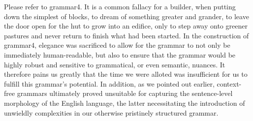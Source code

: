 \documentclass[11pt]{article}
\begin{document}
Please refer to grammar4. It is a common fallacy for a builder, when putting down the simplest of blocks, to dream of something greater and grander, to leave the door open for the hut to grow into an edifice, only to step away onto greener pastures and never return to finish what had been started. In the construction of grammar4, elegance was sacrificed to allow for the grammar to not only be immediately human-readable, but also to ensure that the grammar would be highly robust and sensitive to grammatical, or even semantic, nuances. It therefore pains us greatly that the time we were alloted was insufficient for us to fulfill this grammar's potential. In addition, as we pointed out earlier, context-free grammars ultimately proved unsuitable for capturing the sentence-level morphology of the English language, the latter necessitating the introduction of unwieldly complexities in our otherwise pristinely structured grammar.
\end{document}
